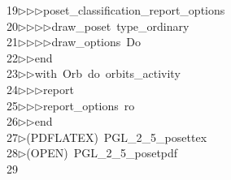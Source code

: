 \begin{tabbing}
19\>$\triangleright$\>$\triangleright$\>$\triangleright$\>poset\_classification\_report\_options\ \\[0pt]
20\>$\triangleright$\>$\triangleright$\>$\triangleright$\>$\triangleright$\>draw\_poset\ type\_ordinary\ \\[0pt]
21\>$\triangleright$\>$\triangleright$\>$\triangleright$\>$\triangleright$\>draw\_options\ Do\ \\[0pt]
22\>$\triangleright$\>$\triangleright$\>end\ \\[0pt]
23\>$\triangleright$\>$\triangleright$\>with\ Orb\ do\ orbits\_activity\ \\[0pt]
24\>$\triangleright$\>$\triangleright$\>$\triangleright$\>report\ \ \\[0pt]
25\>$\triangleright$\>$\triangleright$\>$\triangleright$\>report\_options\ ro\ \\[0pt]
26\>$\triangleright$\>$\triangleright$\>end\ \\[0pt]
27\>$\triangleright$\>(PDFLATEX)\ PGL\_2\_5\_posettex\\[0pt]
28\>$\triangleright$\>(OPEN)\ PGL\_2\_5\_posetpdf\\[0pt]
29\>\end{tabbing}

